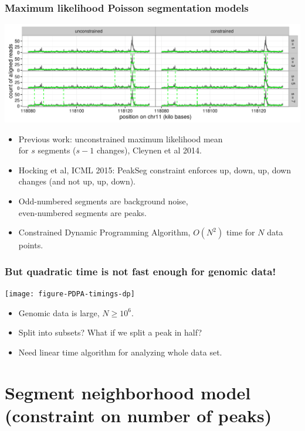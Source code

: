 \documentclass{beamer}
\begin{document}
\begin{frame}
  \frametitle{Maximum likelihood Poisson segmentation models}
  \includegraphics[width=1\textwidth]{figure-Segmentor-PeakSeg}

  \begin{itemize}
  \item Previous work: unconstrained maximum likelihood mean\\
    for $s$ segments ($s-1$ changes), Cleynen et al 2014.
  \item Hocking et al, ICML 2015: PeakSeg constraint enforces up, down, up,
    down changes (and not up, up, down). 
  \item Odd-numbered segments are background noise,\\
    even-numbered segments are peaks.
  \item Constrained Dynamic Programming Algorithm, 
    $O(N^2)$ time for $N$ data points.
  \end{itemize}
\end{frame}

\begin{frame}
  \frametitle{But quadratic time is not fast enough for genomic data!}
  \texttt{[image: figure-PDPA-timings-dp]}
  \begin{itemize}
  \item Genomic data is large, $N \geq 10^6$.
  \item Split into subsets? What if we split a peak in half?
  \item Need linear time algorithm for analyzing whole data set.
  \end{itemize}
\end{frame}

\section{Segment neighborhood model (constraint on number of peaks)}
\end{document}

